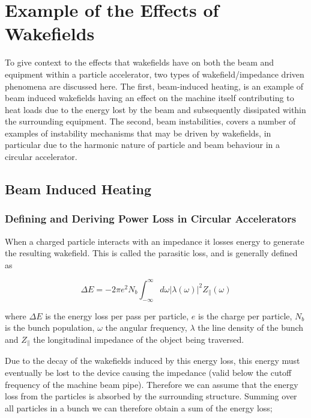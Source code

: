 \section{Example of the Effects of Wakefields}

To give context to the effects that wakefields have on both the beam and equipment within a particle accelerator, two types of wakefield/impedance driven phenomena are discussed here. The first, beam-induced heating, is an example of beam induced wakefields having an effect on the machine itself contributing to heat loads due to the energy lost by the beam and subsequently dissipated within the surrounding equipment. The second, beam instabilities, covers a number of examples of instability mechanisms that may be driven by wakefields, in particular due to the harmonic nature of particle and beam behaviour in a circular accelerator.

\subsection{Beam Induced Heating}
\label{sec:beam_induced_heating}

\subsubsection{Defining and Deriving Power Loss in Circular Accelerators}
\label{sec:power_loss}

When a charged particle interacts with an impedance it losses energy to generate the resulting wakefield. This is called the parasitic loss, and is generally defined as \cite{Chao:PhysColEff, Ng:IntDepInstab, }

\begin{equation}
\Delta E = -2\pi e^{2}N_{b}\int^{\infty}_{-\infty} d\omega \left| \lambda \left( \omega \right)  \right|^{2} Z_{\parallel} \left( \omega \right)
\end{equation}

where $\Delta E$ is the energy loss per pass per particle, $e$ is the charge per particle, $N_{b}$ is the bunch population, $\omega$ the angular frequency, $\lambda$ the line density of the bunch and $Z_{\parallel}$ the longitudinal impedance of the object being traversed.
																
Due to the decay of the wakefields induced by this energy loss, this energy must eventually be lost to the device causing the impedance (valid below the cutoff frequency of the machine beam pipe). Therefore we can assume that the energy loss from the particles is absorbed by the surrounding structure. Summing over all particles in a bunch we can therefore obtain a sum of the energy loss;

